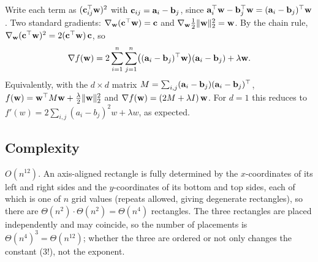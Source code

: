 \begin{solution}
Write each term as $(\mathbf{c}_{ij}^\top\mathbf{w})^2$ with $\mathbf{c}_{ij}=\mathbf{a}_i-\mathbf{b}_j$, since
$\mathbf{a}_i^\top\mathbf{w}-\mathbf{b}_j^\top\mathbf{w}=(\mathbf{a}_i-\mathbf{b}_j)^\top\mathbf{w}$.
Two standard gradients: $\nabla_{\mathbf{w}}(\mathbf{c}^\top\mathbf{w})=\mathbf{c}$ and
$\nabla_{\mathbf{w}}\tfrac12\| \mathbf{w}\|_{2}^2=\mathbf{w}$. By the chain rule,
$\nabla_{\mathbf{w}}(\mathbf{c}^\top\mathbf{w})^2=2(\mathbf{c}^\top\mathbf{w})\,\mathbf{c}$, so
\[
\nabla f(\mathbf{w})=2\sum_{i=1}^n\sum_{j=1}^n\bigl((\mathbf{a}_i-\mathbf{b}_j)^\top\mathbf{w}\bigr)(\mathbf{a}_i-\mathbf{b}_j)
+\lambda\mathbf{w} .
\]
Equivalently, with the $d\times d$ matrix $M=\sum_{i,j}(\mathbf{a}_i-\mathbf{b}_j)(\mathbf{a}_i-\mathbf{b}_j)^\top$,
$f(\mathbf{w})=\mathbf{w}^\top M\mathbf{w}+\tfrac{\lambda}{2}\| \mathbf{w}\|_{2}^2$ and
$\nabla f(\mathbf{w})=(2M+\lambda I)\,\mathbf{w}$.
For $d=1$ this reduces to $f'(w)=2\sum_{i,j}(a_i-b_j)^2w+\lambda w$, as expected.
\end{solution}

\subsection{Complexity}

\begin{solution}
$O(n^{12})$. An axis-aligned rectangle is fully determined by the $x$-coordinates of its left and right
sides and the $y$-coordinates of its bottom and top sides, each of which is one of $n$ grid values (repeats
allowed, giving degenerate rectangles), so there are $\Theta(n^2)\cdot\Theta(n^2)=\Theta(n^4)$ rectangles.
The three rectangles are placed independently and may coincide, so the number of placements is
$\Theta(n^4)^3=\Theta(n^{12})$; whether the three are ordered or not only changes the constant ($3!$), not
the exponent.
\end{solution}

